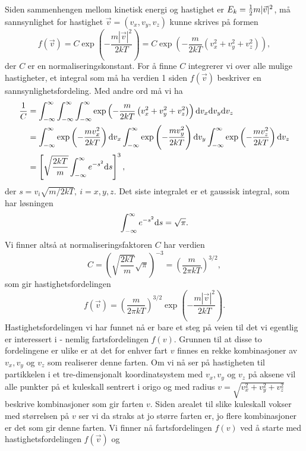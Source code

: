 Siden sammenhengen mellom kinetisk energi og hastighet er $E_k = \frac{1}{2} m|\vec{v}|^2$, må sannsynlighet for hastighet $\vec{v} = (v_x,v_y,v_z)$ kunne skrives på formen
\begin{displaymath}
	f(\vec{v}) = C\exp\left(-\frac{m|\vec{v}|^2}{2kT}\right) = C\exp\left(-\frac{m}{2kT}\left(v_x^2+v_y^2+v_z^2\right)\right),
\end{displaymath}
der $C$ er en normaliseringskonstant. For å finne $C$ integrerer vi over alle mulige hastigheter, et integral som må ha verdien 1 siden $f(\vec{v})$ beskriver en sannsynlighetsfordeling. Med andre ord må vi ha
\begin{displaymath}
\begin{aligned}
	\frac{1}{C} &= \int_{-\infty}^{\infty}\int_{-\infty}^{\infty}\int_{-\infty}^{\infty}\exp\left(-\frac{m}{2kT}\left(v_x^2+v_y^2+v_z^2\right)\right)\text{d} v_x \text{d} v_y \text{d} v_z \\
	&= \int_{-\infty}^{\infty}\exp\left(-\frac{mv_x^2}{2kT}\right)\text{d} v_x  \int_{-\infty}^{\infty}\exp\left(-\frac{mv_y^2}{2kT}\right)\text{d} v_y  \int_{-\infty}^{\infty}\exp\left(-\frac{mv_z^2}{2kT}\right)\text{d} v_z \\
	&= \left[ \sqrt{\frac{2kT}{m}}\int_{-\infty}^\infty e^{-s^2} \text{d} s\right]^3, 
\end{aligned}
\end{displaymath}
der $s = v_i\sqrt{m/2kT},~i = {x,y,z}$. Det siste integralet er et gaussisk integral, som har løsningen
\begin{displaymath}
	\int_{-\infty}^\infty e^{-s^2} \text{d} s  = \sqrt{\pi}.
\end{displaymath}
Vi finner altså at normaliseringsfaktoren $C$ har verdien
\begin{displaymath}
	C =  \left(\sqrt{\frac{2kT}{m}}\sqrt{\pi}\right)^{-3} = \left(\frac{m}{2\pi kT}\right)^{3/2},
\end{displaymath}
som gir hastighetsfordelingen
\begin{displaymath}
	f(\vec{v}) = \left(\frac{m}{2\pi kT}\right)^{3/2}\exp\left(-\frac{m|\vec{v}|^2}{2kT}\right).
\end{displaymath}
Hastighetsfordelingen vi har funnet nå er bare et steg på veien til det vi egentlig er interessert i - nemlig fartsfordelingen $f(v)$. Grunnen til at disse to fordelingene er ulike er at det for enhver fart $v$ finnes en rekke kombinasjoner av $v_x, v_y$ og $v_z$ som realiserer denne farten. Om vi nå ser på hastigheten til partikkelen i et tre-dimensjonalt koordinatsystem med $v_x, v_y$ og $v_z$ på aksene vil alle punkter på et kuleskall sentrert i origo og med radius $v = \sqrt{v_x^2+v_y^2 + v_z^2}$ beskrive kombinasjoner som gir farten $v$. Siden arealet til slike kuleskall vokser med størrelsen på $v$ ser vi da straks at jo større farten er, jo flere kombinasjoner er det som gir denne farten. Vi finner nå fartsfordelingen $f(v)$ ved å starte med hastighetsfordelingen $f(\vec{v})$ og
